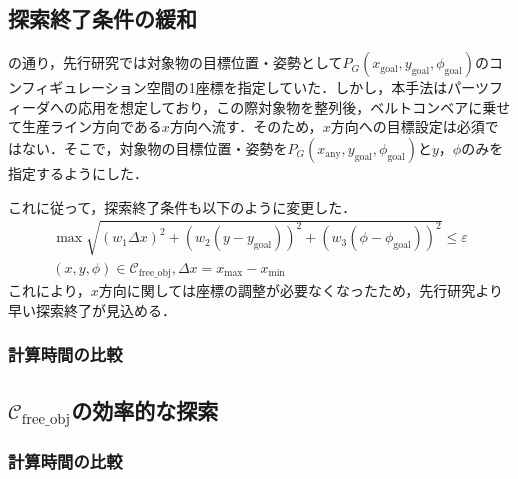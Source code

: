 \documentclass[a4paper,twoside,12pt,papersize, dvipdfmx]{iirthesis}
\begin{document}
\subsection{探索終了条件の緩和}\label{subsec::planner::goalcond}
の通り，先行研究では対象物の目標位置・姿勢として$P_G (x_{\mathrm {goal}}, y_{\mathrm {goal}}, \phi_{\mathrm {goal}})$のコンフィギュレーション空間の1座標を指定していた．しかし，本手法はパーツフィーダへの応用を想定しており，この際対象物を整列後，ベルトコンベアに乗せて生産ライン方向である$x$方向へ流す．そのため，$x$方向への目標設定は必須ではない．そこで，対象物の目標位置・姿勢を$P_G (x_{\mathrm {any}}, y_{\mathrm {goal}}, \phi_{\mathrm {goal}})$と$y$，$\phi$のみを指定するようにした．\par
これに従って，探索終了条件も以下のように変更した．
\begin{gather}
\max \sqrt{(w_1\Delta x)^2 + (w_2(y-y_{\mathrm{goal}}))^2 + (w_3(\phi-\phi_{\mathrm{goal}}))^2} \leq \varepsilon \\
(x, y, \phi) \in \mathcal{C}_{\mathrm{free\_obj}} , \Delta x = x_{\mathrm {max}} - x_{\mathrm {min}}
\end{gather}
これにより，$x$方向に関しては座標の調整が必要なくなったため，先行研究より早い探索終了が見込める．

\subsubsection{計算時間の比較}

\subsection{$\mathcal{C}_{\mathrm{free\_obj}}$の効率的な探索}\label{subsec::planner::dfs}

\subsubsection{計算時間の比較}
\end{document}
